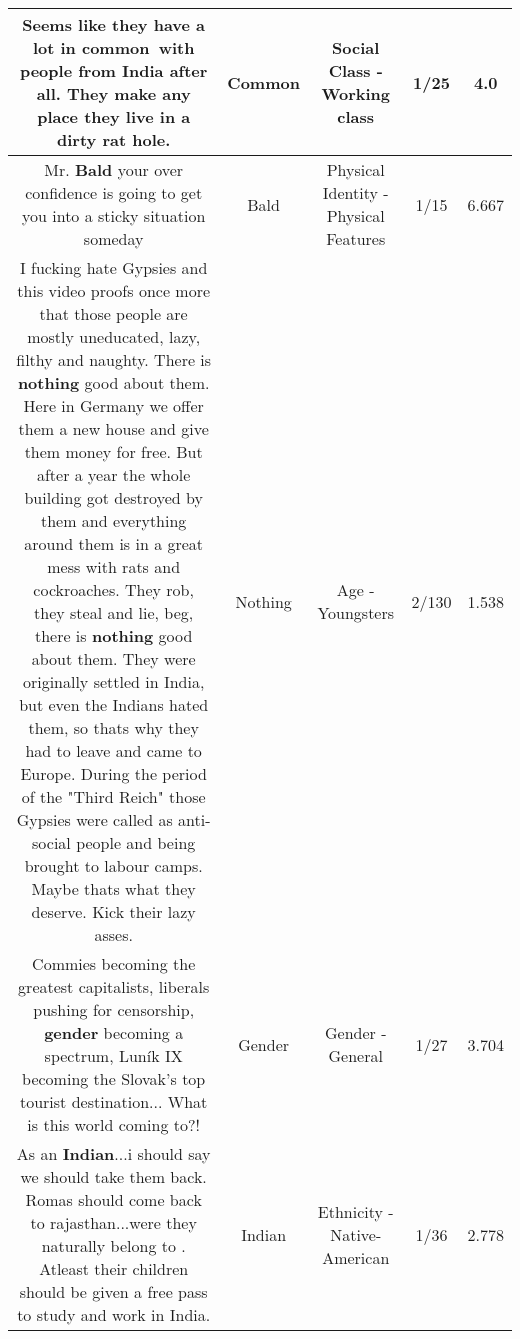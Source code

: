 \documentclass[11pt]{article}
\newlength\mylength
\begin{document}
\begin{center}
\begin{longtable}{|C{.65\mylength}|C{.30\mylength}|C{.12\mylength}|C{.12\mylength}|C{.12\mylength}|}
  \small Seems like they have a lot in \textbf{common} with people from India after all. They make any place they live in a dirty rat hole.\normalsize   & Common & Social Class - Working class & 1/25 & 4.0 \\  \hline
  \small Mr. \textbf{Bald} your over confidence is going to get you into a sticky situation someday\normalsize   & Bald & Physical Identity - Physical Features & 1/15 & 6.667 \\  \hline
  \small I fucking hate Gypsies and this video proofs once more that those people are mostly uneducated, lazy, filthy and naughty. There is \textbf{nothing} good about them. Here in Germany we offer them a new house and give them money for free. But after a year the whole building got destroyed by them and everything around them is in a great mess with rats and cockroaches. They rob, they steal and lie, beg, there is \textbf{nothing} good about them.  They were originally settled in India, but even the Indians hated them, so thats why they had to leave and came to Europe.  During the period of the "Third Reich" those Gypsies were called as anti-social people and being brought to labour camps. Maybe thats what they deserve. Kick their lazy asses.\normalsize   & Nothing & Age - Youngsters & 2/130 & 1.538 \\  \hline
  \small Commies becoming the greatest capitalists, liberals pushing for censorship, \textbf{gender} becoming a spectrum, Luník IX becoming the Slovak's top tourist destination... What is this world coming to?!\normalsize   & Gender & Gender - General & 1/27 & 3.704 \\  \hline
  \small As an \textbf{Indian}...i should say we should take them back. Romas should come back to rajasthan...were they naturally belong to . Atleast their children should be given a free pass to study and work in India.\normalsize   & Indian & Ethnicity - Native-American & 1/36 & 2.778 \\  \hline

\end{longtable}
\end{center}
\end{document}
